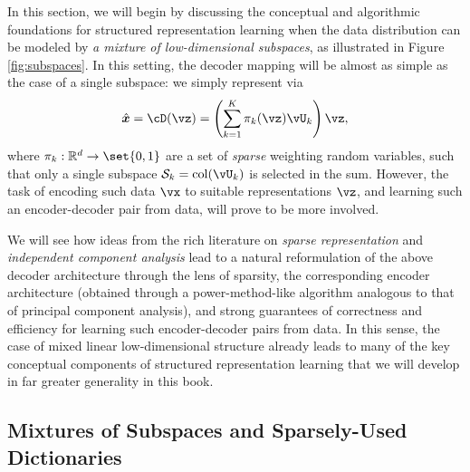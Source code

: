 \documentclass[../../book-main.tex]{subfiles}
\begin{document}
In this section, we will begin by discussing the conceptual and algorithmic
foundations for structured representation learning when the data distribution
can be modeled by {\em a mixture of low-dimensional subspaces}, as illustrated in Figure \ref{fig:subspaces}. In this setting, the decoder mapping will be almost as simple as the case of a single subspace: we simply represent via
\begin{equation}\label{eq:mixture-subspaces-decoder-first-cut}
    \hat{\x} = \cD(\vz) = \left( \sum_{k=1}^K \pi_k(\vz)\vU_k \right) \vz,
\end{equation}
where $\pi_k : \R^d \to \set{0,1}$ are a set of \textit{sparse} weighting random
variables, such that only a single subspace $\mathcal{S}_k
= \mathop{\mathrm{col}}(\vU_k) $ is selected in the sum.
However, the task of encoding such data $\vx$ to suitable representations $\vz$, and learning such an encoder-decoder pair from data, will prove to be more involved.

We will see how ideas from the rich literature on \textit{sparse representation}
and \textit{independent component analysis} lead to a natural reformulation of
the above decoder architecture through the lens of sparsity, the corresponding
encoder architecture (obtained through a power-method-like algorithm analogous
to that of principal component analysis), and strong guarantees of correctness
and efficiency for learning such encoder-decoder pairs from data. In this sense,
the case of mixed linear low-dimensional structure already leads to many of the
key conceptual components of structured representation learning that we will develop in
far greater generality in this book.


\subsection{Mixtures of Subspaces and Sparsely-Used
Dictionaries}\label{sec:mixture-and-dict}

\end{document}
